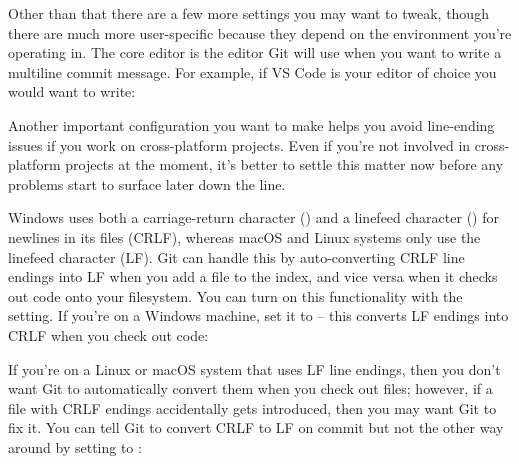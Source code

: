 \begin{flushleft}
	Other than that there are a few more settings you may want to tweak, though there
	are much more user-specific because they depend on the environment you're operating
	in. The core editor is the editor Git will use when you want to write a multiline
	commit message. For example, if VS Code is your editor of choice you would want to write:
\end{flushleft}

\begin{flushleft}
\end{flushleft}

\begin{flushleft}
	Another important configuration you want to make helps you avoid line-ending
	issues if you work on cross-platform projects. Even if you're not involved in
	cross-platform projects at the moment, it's better to settle this matter now
	before any problems start to surface later down the line.
\end{flushleft}

\begin{flushleft}
	Windows uses both a carriage-return character (\icli{\carret}) and a linefeed character
	(\icli{\linefeed}) for newlines in its files (CRLF), whereas macOS and Linux systems only
	use the linefeed character (LF). Git can handle this by auto-converting CRLF line endings into LF
	when you add a file to the index, and vice versa when it checks out code onto your filesystem. You
	can turn on this functionality with the  setting. If you’re on a Windows machine,
	set it to  -- this converts LF endings into CRLF when you check out code:
\end{flushleft}

\begin{flushleft}
\end{flushleft}

\begin{flushleft}
	If you're on a Linux or macOS system that uses LF line endings, then you don’t want Git to automatically
	convert them when you check out files; however, if a file with CRLF endings accidentally gets introduced,
	then you may want Git to fix it. You can tell Git to convert CRLF to LF on commit but not the other way
	around by setting  to :
\end{flushleft}


